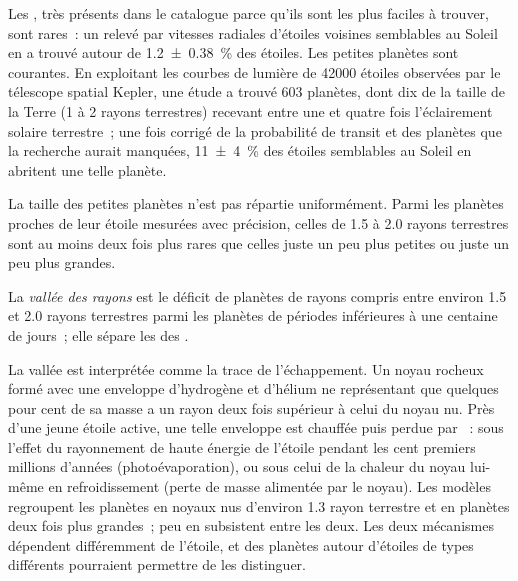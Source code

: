 Les , très présents dans le catalogue parce qu'ils sont les plus faciles à
trouver, sont rares~: un relevé par vitesses radiales d'étoiles voisines semblables au Soleil
en a trouvé autour de \qty[separate-uncertainty=true]{1.2 \pm 0.38}{\percent} des étoiles. Les petites planètes sont
courantes. En exploitant les courbes de lumière de \num{42000} étoiles observées par le
télescope spatial Kepler, une étude a trouvé 603 planètes, dont dix de la taille de la Terre (1 à 2
rayons terrestres) recevant entre une et quatre fois l'éclairement solaire terrestre~; une fois
corrigé de la probabilité de transit et des planètes que la recherche aurait manquées,
\qty[separate-uncertainty=true]{11 \pm 4}{\percent} des étoiles semblables au Soleil en abritent une telle
planète.

La taille des petites planètes n'est pas répartie uniformément. Parmi les planètes proches
de leur étoile mesurées avec précision, celles de 1.5 à 2.0 rayons terrestres sont au
moins deux fois plus rares que celles juste un peu plus petites ou juste un peu plus grandes.

\begin{definition}\label{def:b3:exoplanets:radius-valley}
La \emph{vallée des rayons} est le déficit de planètes
de rayons compris entre environ 1.5 et 2.0 rayons terrestres parmi les planètes
de périodes inférieures à une centaine de jours~; elle sépare les 
des .
\end{definition}

La vallée est interprétée comme la trace de l'échappement. Un noyau rocheux formé avec une
enveloppe d'hydrogène et d'hélium ne représentant que quelques pour cent de sa masse a un
rayon deux fois supérieur à celui du noyau nu. Près d'une jeune étoile active, une telle
enveloppe est chauffée puis perdue par ~: sous l'effet du
rayonnement de haute énergie de l'étoile pendant les cent premiers millions d'années
(photoévaporation), ou sous celui de la chaleur du noyau lui-même en refroidissement
(perte de masse alimentée par le noyau). Les modèles regroupent les planètes en noyaux nus
d'environ 1.3 rayon terrestre et en planètes deux fois plus grandes~; peu en subsistent
entre les deux. Les deux mécanismes dépendent différemment de l'étoile, et des planètes
autour d'étoiles de types différents pourraient permettre de les distinguer.

